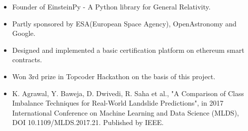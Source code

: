 

\begin{itemize}
\item Founder of EinsteinPy - A Python library for General Relativity.
\item Partly sponsored by ESA(European Space Agency), OpenAstronomy and Google.
\end{itemize}
\smallskip

\begin{itemize}
    \item Designed and implemented a basic certification platform on ethereum smart contracts.
    \item Won 3rd prize in Topcoder Hackathon on the basis of this project.
\end{itemize}
\smallskip



\smallskip
\begin{itemize}
\item K. Agrawal, Y. Baweja, D. Dwivedi, R. Saha et al., "A Comparison of Class Imbalance Techniques for Real-World Landslide Predictions", in 2017 International Conference on Machine Learning and Data Science (MLDS), DOI 10.1109/MLDS.2017.21. Published by IEEE.
\end{itemize}

